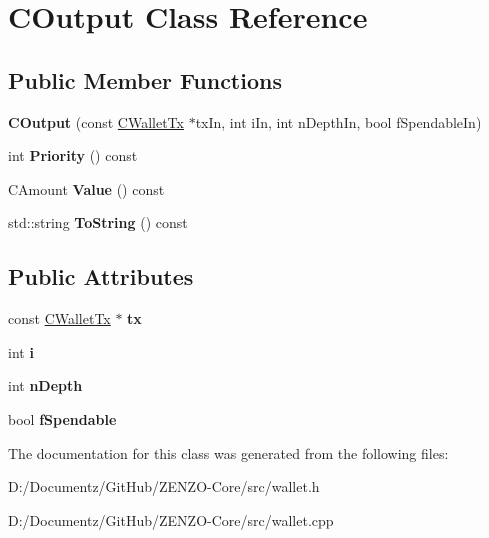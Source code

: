 \hypertarget{class_c_output}{}\section{C\+Output Class Reference}
\label{class_c_output}
\subsection*{Public Member Functions}
\begin{DoxyCompactItemize}
\item 
\mbox{\label{class_c_output_aeabdb54cd3dbac8e985cae6aa976c575}} 
{\bfseries C\+Output} (const \mbox{\hyperlink{class_c_wallet_tx}{C\+Wallet\+Tx}} $\ast$tx\+In, int i\+In, int n\+Depth\+In, bool f\+Spendable\+In)
\item 
\mbox{\label{class_c_output_a1e98c1005aec356c68c4f56ff9a02944}} 
int {\bfseries Priority} () const
\item 
\mbox{\label{class_c_output_ab16e44b7236e505fea97ca1bf8ade631}} 
C\+Amount {\bfseries Value} () const
\item 
std\+::string {\bfseries To\+String} () const
\end{DoxyCompactItemize}
\subsection*{Public Attributes}
\begin{DoxyCompactItemize}
\item 
\mbox{\label{class_c_output_ad5c15e7a2dc48258127b8fd5db421ad5}} 
const \mbox{\hyperlink{class_c_wallet_tx}{C\+Wallet\+Tx}} $\ast$ {\bfseries tx}
\item 
\mbox{\label{class_c_output_ae1b3534a41afb09bb04a499017f2821e}} 
int {\bfseries i}
\item 
\mbox{\label{class_c_output_a2eb24fc73c35fcc551b736d68bd1c64a}} 
int {\bfseries n\+Depth}
\item 
\mbox{\label{class_c_output_ab8fa647313fbc2cda12f8b064031dd11}} 
bool {\bfseries f\+Spendable}
\end{DoxyCompactItemize}


The documentation for this class was generated from the following files\+:\begin{DoxyCompactItemize}
\item 
D\+:/\+Documentz/\+Git\+Hub/\+Z\+E\+N\+Z\+O-\/\+Core/src/wallet.\+h\item 
D\+:/\+Documentz/\+Git\+Hub/\+Z\+E\+N\+Z\+O-\/\+Core/src/wallet.\+cpp\end{DoxyCompactItemize}
